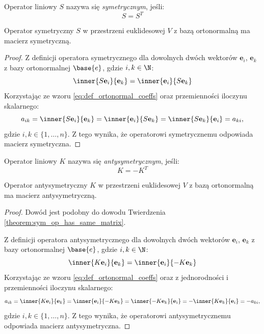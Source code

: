 \begin{definition}\label{def:symmetric_operator}
Operator liniowy $S$ nazywa się \textit{symetrycznym}, jeśli:
$$S = S^T$$
\end{definition}
\begin{theorem}\label{theorem:sym_op_has_same_matrix}
    Operator symetryczny $S$ w przestrzeni euklidesowej $V$ z bazą ortonormalną ma macierz symetryczną.
\end{theorem}
\begin{proof}
    Z definicji operatora symetrycznego dla dowolnych dwóch wektorów $\textbf{e}_i$, $\textbf{e}_k$ z bazy ortonormalnej $\base{e}$, gdzie $i, k \in \N$:
    $$\inner{S\textbf{e}_i}{\textbf{e}_k} = \inner{\textbf{e}_i}{S\textbf{e}_k}$$
    Korzystając ze wzoru \eqref{eq:def_ortonormal_coeffs} oraz przemienności iloczynu skalarnego:
    $$ a_{ik} = \inner{S\textbf{e}_i}{\textbf{e}_k} = \inner{\textbf{e}_i}{S\textbf{e}_k} = \inner{S\textbf{e}_k}{\textbf{e}_i} = a_{ki}, $$ gdzie $i, k \in \{1, \dots, n\}$. Z tego wynika, że operatorowi symetrycznemu odpowiada macierz symetryczna.
\end{proof}

\begin{definition}\label{def:skew_symmetric_operator}
Operator liniowy $K$ nazywa się \textit{antysymetrycznym}, jeśli:
$$K = -K^T$$
\end{definition}

\begin{theorem}
    Operator antysymetryczny $K$ w przestrzeni euklidesowej $V$ z bazą ortonormalną ma macierz antysymetryczną.
\end{theorem}
\begin{proof}
    Dowód jest podobny do dowodu Twierdzenia \ref{theorem:sym_op_has_same_matrix}.

    Z definicji operatora antysymetrycznego dla dowolnych dwóch wektorów $\textbf{e}_i$, $\textbf{e}_k$ z bazy ortonormalnej $\base{e}$, gdzie $i, k \in \N$:
    $$\inner{K\textbf{e}_i}{\textbf{e}_k} = \inner{\textbf{e}_i}{-K\textbf{e}_k}$$
    Korzystając ze wzoru \eqref{eq:def_ortonormal_coeffs} oraz z jednorodności i przemienności iloczynu skalarnego:
    $$ a_{ik} = \inner{K\textbf{e}_i}{\textbf{e}_k} = \inner{\textbf{e}_i}{-K\textbf{e}_k} = \inner{-K\textbf{e}_k}{\textbf{e}_i} = -\inner{K\textbf{e}_k}{\textbf{e}_i} = -a_{ki}, $$ gdzie $i, k \in \{1, \dots, n\}$. Z tego wynika, że operatorowi antysymetrycznemu odpowiada macierz antysymetryczna.
\end{proof}

